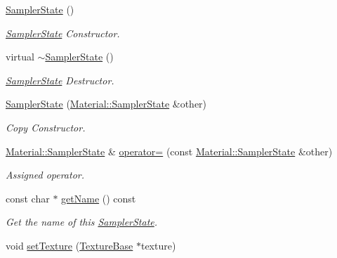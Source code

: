 \begin{DoxyCompactItemize}
\item 
\hyperlink{class_i_dream_sky_1_1_material_1_1_sampler_state_a983a567b70e790865bfedfb8547b51d5}{Sampler\+State} ()
\begin{DoxyCompactList}\small\item\em \hyperlink{class_i_dream_sky_1_1_material_1_1_sampler_state}{Sampler\+State} Constructor. \end{DoxyCompactList}\item 
virtual \hyperlink{class_i_dream_sky_1_1_material_1_1_sampler_state_a616ede01faa3bb0f3d87cf92f8e36f3f}{$\sim$\+Sampler\+State} ()
\begin{DoxyCompactList}\small\item\em \hyperlink{class_i_dream_sky_1_1_material_1_1_sampler_state}{Sampler\+State} Destructor. \end{DoxyCompactList}\item 
\hyperlink{class_i_dream_sky_1_1_material_1_1_sampler_state_a5746f28f616efc0af967afbda6a52a5d}{Sampler\+State} (\hyperlink{class_i_dream_sky_1_1_material_1_1_sampler_state}{Material\+::\+Sampler\+State} \&other)
\begin{DoxyCompactList}\small\item\em Copy Constructor. \end{DoxyCompactList}\item 
\hyperlink{class_i_dream_sky_1_1_material_1_1_sampler_state}{Material\+::\+Sampler\+State} \& \hyperlink{class_i_dream_sky_1_1_material_1_1_sampler_state_ab8f367f7ff72c553fc817dce20f1a0b0}{operator=} (const \hyperlink{class_i_dream_sky_1_1_material_1_1_sampler_state}{Material\+::\+Sampler\+State} \&other)
\begin{DoxyCompactList}\small\item\em Assigned operator. \end{DoxyCompactList}\item 
const char $\ast$ \hyperlink{class_i_dream_sky_1_1_material_1_1_sampler_state_a735b8048ed883a4b48582bf7e7d87cd9}{get\+Name} () const 
\begin{DoxyCompactList}\small\item\em Get the name of this \hyperlink{class_i_dream_sky_1_1_material_1_1_sampler_state}{Sampler\+State}. \end{DoxyCompactList}\item 
void \hyperlink{class_i_dream_sky_1_1_material_1_1_sampler_state_a3dc1f90e1be84f7e1aaa68aec15e2c0e}{set\+Texture} (\hyperlink{class_i_dream_sky_1_1_texture_base}{Texture\+Base} $\ast$texture)

\end{DoxyCompactItemize}
